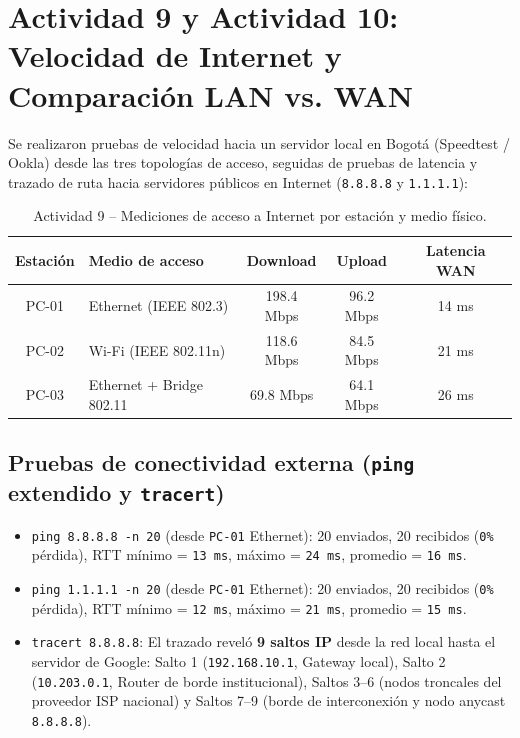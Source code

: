 \documentclass[11pt, a4paper]{article}
\begin{document}
\section{Actividad 9 y Actividad 10: Velocidad de Internet y Comparación LAN vs. WAN}

Se realizaron pruebas de velocidad hacia un servidor local en Bogotá (Speedtest / Ookla) desde las tres topologías de acceso, seguidas de pruebas de latencia y trazado de ruta hacia servidores públicos en Internet (\texttt{8.8.8.8} y \texttt{1.1.1.1}):

\begin{table}[h!]
\centering
\small
\setlength{\tabcolsep}{4pt}
\caption{Actividad 9 -- Mediciones de acceso a Internet por estación y medio físico.}
\begin{tabularx}{\textwidth}{c >{\centering\arraybackslash}X c c c}
\toprule
\textbf{Estación} & \textbf{Medio de acceso} & \textbf{Download} & \textbf{Upload} & \textbf{Latencia WAN} \\
\midrule
PC-01 & Ethernet (IEEE 802.3) & 198.4 Mbps & 96.2 Mbps & 14 ms \\
PC-02 & Wi-Fi (IEEE 802.11n) & 118.6 Mbps & 84.5 Mbps & 21 ms \\
PC-03 & Ethernet + Bridge 802.11 & 69.8 Mbps & 64.1 Mbps & 26 ms \\
\bottomrule
\end{tabularx}
\end{table}

\subsection*{Pruebas de conectividad externa (\texttt{ping} extendido y \texttt{tracert})}
\begin{itemize}
    \item \texttt{ping 8.8.8.8 -n 20} (desde \texttt{PC-01} Ethernet): 20 enviados, 20 recibidos (\texttt{0\%} pérdida), RTT mínimo = \texttt{13 ms}, máximo = \texttt{24 ms}, promedio = \texttt{16 ms}.
    \item \texttt{ping 1.1.1.1 -n 20} (desde \texttt{PC-01} Ethernet): 20 enviados, 20 recibidos (\texttt{0\%} pérdida), RTT mínimo = \texttt{12 ms}, máximo = \texttt{21 ms}, promedio = \texttt{15 ms}.
    \item \texttt{tracert 8.8.8.8}: El trazado reveló \textbf{9 saltos IP} desde la red local hasta el servidor de Google: Salto 1 (\texttt{192.168.10.1}, Gateway local), Salto 2 (\texttt{10.203.0.1}, Router de borde institucional), Saltos 3--6 (nodos troncales del proveedor ISP nacional) y Saltos 7--9 (borde de interconexión y nodo anycast \texttt{8.8.8.8}).
\end{itemize}
\end{document}
